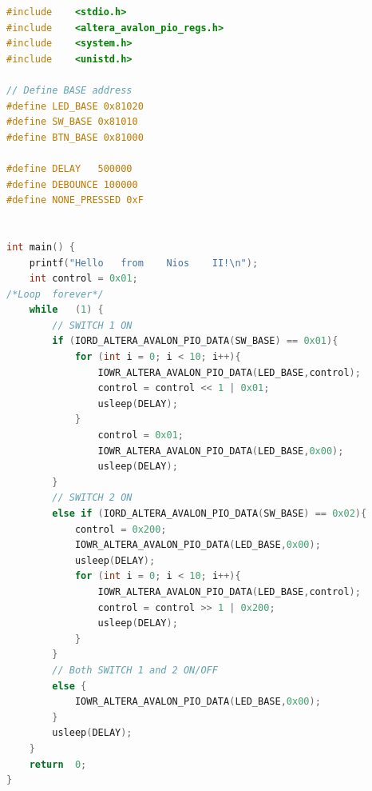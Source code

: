 \begin{lstlisting}[language=C, caption={C Source Code – Exercise 1 (LAB2)}]
#include	<stdio.h>
#include	<altera_avalon_pio_regs.h>
#include	<system.h>
#include	<unistd.h>

// Define BASE address
#define LED_BASE 0x81020
#define SW_BASE 0x81010
#define BTN_BASE 0x81000

#define	DELAY	500000
#define DEBOUNCE 100000
#define NONE_PRESSED 0xF


int	main() {
	printf("Hello	from	Nios	II!\n");
	int control = 0x01;
/*Loop	forever*/
	while	(1) {
		// SWITCH 1 ON
		if (IORD_ALTERA_AVALON_PIO_DATA(SW_BASE) == 0x01){
			for (int i = 0; i < 10; i++){
				IOWR_ALTERA_AVALON_PIO_DATA(LED_BASE,control);
				control = control << 1 | 0x01;
				usleep(DELAY);
			}
				control = 0x01;
				IOWR_ALTERA_AVALON_PIO_DATA(LED_BASE,0x00);
				usleep(DELAY);
		}
		// SWITCH 2 ON
		else if (IORD_ALTERA_AVALON_PIO_DATA(SW_BASE) == 0x02){
			control = 0x200;
			IOWR_ALTERA_AVALON_PIO_DATA(LED_BASE,0x00);
			usleep(DELAY);
			for (int i = 0; i < 10; i++){
				IOWR_ALTERA_AVALON_PIO_DATA(LED_BASE,control);
				control = control >> 1 | 0x200;
				usleep(DELAY);
			}
		}
		// Both SWITCH 1 and 2 ON/OFF
		else {
			IOWR_ALTERA_AVALON_PIO_DATA(LED_BASE,0x00);
		}
		usleep(DELAY);
	}
	return	0;
}
\end{lstlisting}

